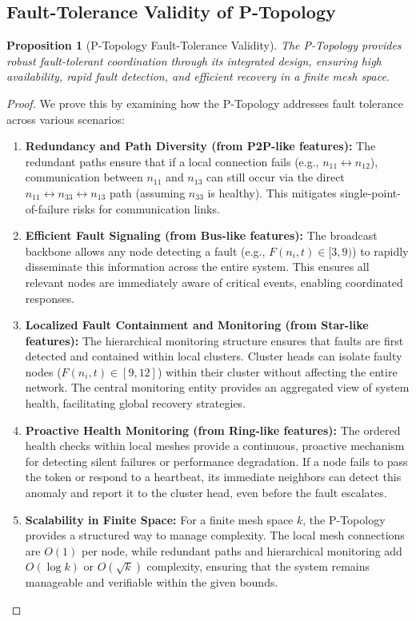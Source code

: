 \documentclass[10pt]{article}
\newtheorem{proposition}[theorem]{Proposition}
\begin{document}
\subsection{Fault-Tolerance Validity of P-Topology}
\begin{proposition}[P-Topology Fault-Tolerance Validity]
The P-Topology provides robust fault-tolerant coordination through its integrated design, ensuring high availability, rapid fault detection, and efficient recovery in a finite mesh space.
\end{proposition}
\begin{proof}
We prove this by examining how the P-Topology addresses fault tolerance across various scenarios:
\begin{enumerate}
    \item \textbf{Redundancy and Path Diversity (from P2P-like features):} The redundant paths ensure that if a local connection fails (e.g., $n_{11} \leftrightarrow n_{12}$), communication between $n_{11}$ and $n_{13}$ can still occur via the direct $n_{11} \leftrightarrow n_{33} \leftrightarrow n_{13}$ path (assuming $n_{33}$ is healthy). This mitigates single-point-of-failure risks for communication links.
    \item \textbf{Efficient Fault Signaling (from Bus-like features):} The broadcast backbone allows any node detecting a fault (e.g., $F(n_i,t) \in [3,9)$) to rapidly disseminate this information across the entire system. This ensures all relevant nodes are immediately aware of critical events, enabling coordinated responses.
    \item \textbf{Localized Fault Containment and Monitoring (from Star-like features):} The hierarchical monitoring structure ensures that faults are first detected and contained within local clusters. Cluster heads can isolate faulty nodes ($F(n_i,t) \in [9,12]$) within their cluster without affecting the entire network. The central monitoring entity provides an aggregated view of system health, facilitating global recovery strategies.
    \item \textbf{Proactive Health Monitoring (from Ring-like features):} The ordered health checks within local meshes provide a continuous, proactive mechanism for detecting silent failures or performance degradation. If a node fails to pass the token or respond to a heartbeat, its immediate neighbors can detect this anomaly and report it to the cluster head, even before the fault escalates.
    \item \textbf{Scalability in Finite Space:} For a finite mesh space $k$, the P-Topology provides a structured way to manage complexity. The local mesh connections are $O(1)$ per node, while redundant paths and hierarchical monitoring add $O(\log k)$ or $O(\sqrt{k})$ complexity, ensuring that the system remains manageable and verifiable within the given bounds.

\end{enumerate}
\end{proof}
\end{document}
